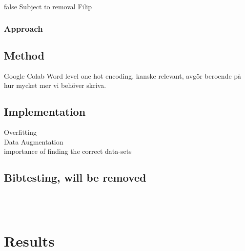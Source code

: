 \documentclass[nofilelist]{cslthse-msc}
\begin{document}






















\ifx false
Subject to removal
Filip
\subsection{Approach} 
\section{Method}
Google Colab
Word level one hot encoding, kanske relevant, avgör beroende på hur mycket mer vi behöver skriva.
\section{Implementation}
Overfitting \\
Data Augmentation \\
importance of finding the correct data-sets \\
\section{Bibtesting, will be removed}
\citep{emotionlinesdataset} \\
\citep{franoischollet2017learning}\\
\citep{beaver2020towards}

\fi

\chapter{Results}
\label{result_chapter}
\end{document}
